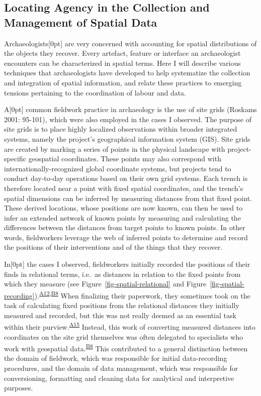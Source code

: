 \documentclass[
]{article}
\newcommand{\paragraphnumber}[1]{\marginnote{\color{lightgray}\tiny{#1}}[0pt]}
\begin{document}
\subsection{Locating Agency in the Collection and Management of Spatial
Data}\label{locating-agency-in-the-collection-and-management-of-spatial-data}

Archaeologists\paragraphnumber{[69]} are very concerned with accounting
for spatial distributions of the objects they recover. Every artefact,
feature or interface an archaeologist encounters can be characterized in
spatial terms. Here I will describe various techniques that
archaeologists have developed to help systematize the collection and
integration of spatial information, and relate these practices to
emerging tensions pertaining to the coordination of labour and data.

A\paragraphnumber{[70]} common fieldwork practice in archaeology is the
use of site grids (Roskams 2001: 95-101), which were also employed in
the cases I observed. The purpose of site grids is to place highly
localized observations within broader integrated systems, namely the
project's geographical information system (GIS). Site grids are created
by marking a series of points in the physical landscape with
project-specific geospatial coordinates. These points may also
correspond with internationally-recognized global coordinate systems,
but projects tend to conduct day-to-day operations based on their own
grid systems. Each trench is therefore located near a point with fixed
spatial coordinates, and the trench's spatial dimensions can be inferred
by measuring distances from that fixed point. These derived locations,
whose positions are now known, can then be used to infer an extended
network of known points by measuring and calculating the differences
between the distances from target points to known points. In other
words, fieldworkers leverage the web of inferred points to determine and
record the positions of their interventions and of the things that they
recover.

In\paragraphnumber{[71]} the cases I observed, fieldworkers initially
recorded the positions of their finds in relational terms, i.e.~as
distances in relation to the fixed points from which they measure (see
Figure~\ref{fig-spatial-relational} and
Figure~\ref{fig-spatial-recording}).\textsuperscript{\hyperref[sec-A12]{A12},\hyperref[sec-B8]{B8}}
When finalizing their paperwork, they sometimes took on the task of
calculating fixed positions from the relational distances they initially
measured and recorded, but this was not really deemed as an essential
task within their purview.\textsuperscript{\hyperref[sec-A15]{A15}}
Instead, this work of converting measured distances into coordinates on
the site grid themselves was often delegated to specialists who work
with geospatial data.\textsuperscript{\hyperref[sec-B8]{B8}} This
contributed to a general distinction between the domain of fieldwork,
which was responsible for initial data-recording procedures, and the
domain of data management, which was responsible for conversioning,
formatting and cleaning data for analytical and interpretive purposes.
\end{document}
